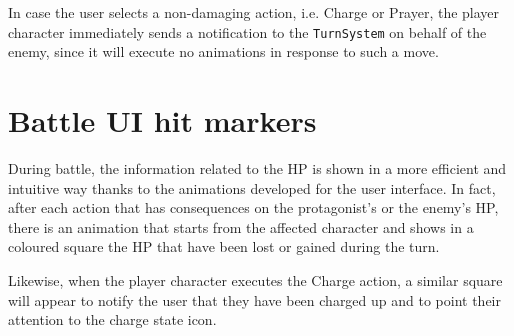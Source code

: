 In case the user selects a non-damaging action, i.e. Charge or Prayer, the player character immediately sends a notification to the \texttt{TurnSystem} on behalf of the enemy, since it will execute no animations in response to such a move.



\section{Battle UI hit markers}
During battle, the information related to the HP is shown in a more efficient and intuitive way thanks to the animations developed for the user interface. In fact, after each action that has consequences on the protagonist's or the enemy's HP, there is an animation that starts from the affected character and shows in a coloured square the HP that have been lost or gained during the turn.

Likewise, when the player character executes the Charge action, a similar square will appear to notify the user that they have been charged up and to point their attention to the charge state icon.

